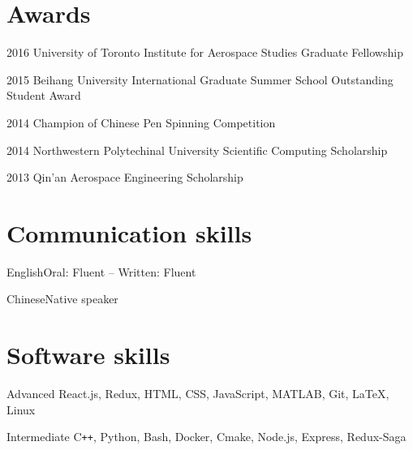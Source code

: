 \documentclass{tccv}
\begin{document}
\section{Awards}

\begin{factlist}
  \item{2016}
  {University of Toronto Institute for Aerospace Studies Graduate Fellowship}

  \item{2015}
  {Beihang University International Graduate Summer School Outstanding Student Award}

  \item{2014}
  {Champion of Chinese Pen Spinning Competition}

  \item{2014}
  {Northwestern Polytechinal University Scientific Computing Scholarship}

  \item{2013}
  {Qin'an Aerospace Engineering Scholarship}

\end{factlist}

\section{Communication skills}
\begin{factlist}
  \item{English}{Oral: Fluent -- Written: Fluent}
  \item{Chinese}{Native speaker}
\end{factlist}

\section{Software skills}
\begin{factlist}
  \item{Advanced}
  {React.js, Redux, HTML, CSS, JavaScript, MATLAB, Git, \LaTeX, Linux}

  \item{Intermediate}
  {C\texttt{++}, Python, Bash, Docker, Cmake, Node.js, Express, Redux-Saga}

\end{factlist}
\end{document}
